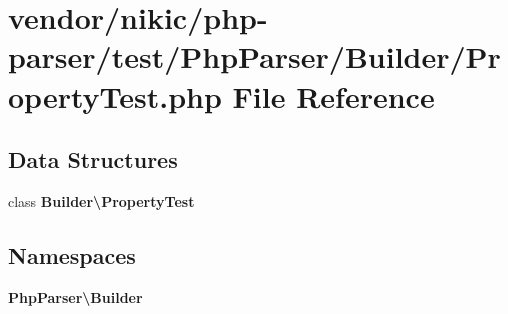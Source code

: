 \section{vendor/nikic/php-\/parser/test/\+Php\+Parser/\+Builder/\+Property\+Test.php File Reference}
\label{_builder_2_property_test_8php}
\subsection*{Data Structures}
\begin{DoxyCompactItemize}
\item 
class {\bf Builder\textbackslash{}\+Property\+Test}
\end{DoxyCompactItemize}
\subsection*{Namespaces}
\begin{DoxyCompactItemize}
\item 
 {\bf Php\+Parser\textbackslash{}\+Builder}
\end{DoxyCompactItemize}
